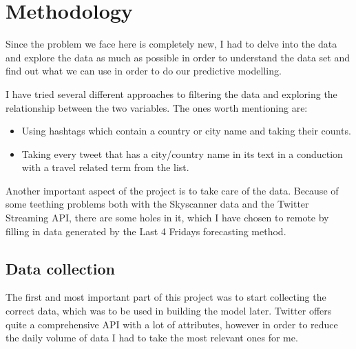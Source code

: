 \documentclass[minf,frontabs,twoside,singlespacing,parskip]{infthesis} %
\begin{document}
\chapter{Methodology}


Since the problem we face here is completely new, I had to delve into the data and explore the data as much as possible in order to understand the data set and find out what we can use in order to do our predictive modelling.

I have tried several different approaches to filtering the data and exploring the relationship between the two variables. The ones worth mentioning are:
\begin{itemize}
\item Using hashtags which contain a country or city name and taking their counts.
\item Taking every tweet that has a city/country name in its text in a conduction with a travel related term from the list. 
\end{itemize}

Another important aspect of the project is to take care of the data. Because of some teething problems both with the Skyscanner data and the Twitter Streaming API, there are some holes in it, which I have chosen to remote by filling in data generated by the Last 4 Fridays forecasting method. 


\section{Data collection}

The first and most important part of this project was to start collecting the correct data, which was to be used in building the model later. Twitter offers quite a comprehensive API with a lot of attributes, however in order to reduce the daily volume of data I had to take the most relevant ones for me. 
\end{document}
